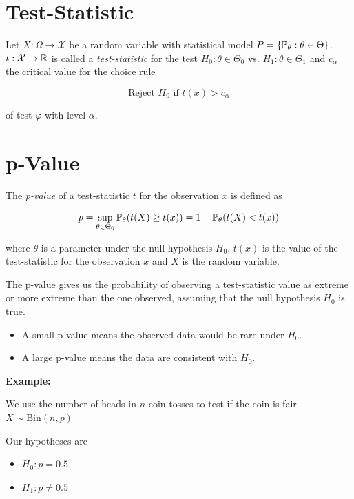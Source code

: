 \section{Test-Statistic}

Let \(X: \Omega \to \mathcal{X}\) be a random variable with statistical model \(P = \{\mathbb{P}_\theta : \theta \in \Theta\}\). \(t : \mathcal{X} \to \mathbb{R}\) is 
called a \emph{test-statistic} for the test \(H_0 : \theta \in \Theta_0\) vs. \(H_1: \theta \in \Theta_1\) and 
\(c_\alpha\) the critical value for the choice rule 

\[
    \text{Reject } H_0 \text{ if } t(x) > c_\alpha
\]

of test \(\varphi\) with level \(\alpha\). 

\section{p-Value}

The \emph{p-value} of a test-statistic \(t\) for the observation \(x\) is defined as

\[
    p =  \sup_{\theta \in \Theta_0} \mathbb{P}_{\theta}(t(X) \ge t(x)) = 1 - \mathbb{P}_{\theta}(t(X) < t(x))
\]

where \(\theta\) is a parameter under the null-hypothesis \(H_0\), \(t(x)\) is the value of the test-statistic for the observation \(x\) and \(X\) is the random variable.

The p-value gives us the probability of observing a test-statistic value as extreme or more extreme than the one observed, 
assuming that the null hypothesis \(H_0\) is true.

\begin{itemize}

    \item A small p-value means the observed data would be rare under \(H_0\).

    \item A large p-value means the data are consistent with \(H_0\).

\end{itemize}

\textbf{Example:}

We use the number of heads in \(n\) coin tosses to test if the coin is fair. 
\(X \sim \mathrm{Bin}(n,p)\)

Our hypotheses are 

\begin{itemize}

    \item \(H_0: p = 0.5\)

    \item \(H_1: p \ne 0.5\)

\end{itemize}

